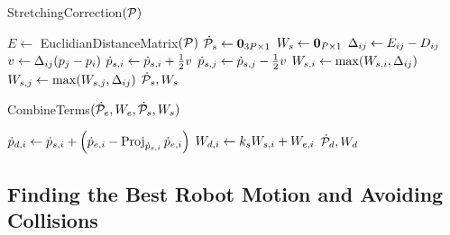 \begin{algorithm}[h]
\caption{StretchingCorrection$(\mathcal{P})$}
\begin{algorithmic}[1]
    \State $E \gets$ EuclidianDistanceMatrix$(\mathcal{P})$
    \State $\dot{\mathcal{P}}_s \gets \mathbf{0}_{{3P} \times 1}$
    \State $W_s \gets \mathbf{0}_{P \times 1}$
                \State $\Delta_{i j} \gets E_{i j} - D_{i j}$
                \State $v \gets \Delta_{i j}(p_j - p_i)$
                \State $\dot{p}_{s,i} \gets \dot{p}_{s,i} + \frac{1}{2}v$
                \State $\dot{p}_{s,j} \gets \dot{p}_{s,j} - \frac{1}{2}v$
                \State $W_{s,i} \gets \max (W_{s,i}, \Delta_{i j})$
                \State $W_{s,j} \gets \max (W_{s,j}, \Delta_{i j})$
            \EndIf
        \EndFor
    \EndFor
    \State \Return $\dot{\mathcal{P}}_s, W_s$
\end{algorithmic}
\label{alg:stretching_correction_ijrr}
\end{algorithm}

\begin{algorithm}[h]
\caption{CombineTerms$(\dot{\mathcal{P}}_e, W_e, \dot{\mathcal{P}}_s, W_s)$}
\begin{algorithmic}[1]
        \State $\dot{p}_{d,i} \gets \dot{p}_{s,i} + \left( \dot{p}_{e,i} - \operatorname*{Proj}_{\dot{p}_{s,i}} \dot{p}_{e,i} \right)$
        \State $W_{d,i} \gets k_s W_{s,i} + W_{e,i}$
    \EndFor
    \State \Return $\dot{\mathcal{P}}_d, W_d$
\end{algorithmic}
\label{alg:combine_terms}
\end{algorithm}


\subsection{Finding the Best Robot Motion and Avoiding Collisions}

